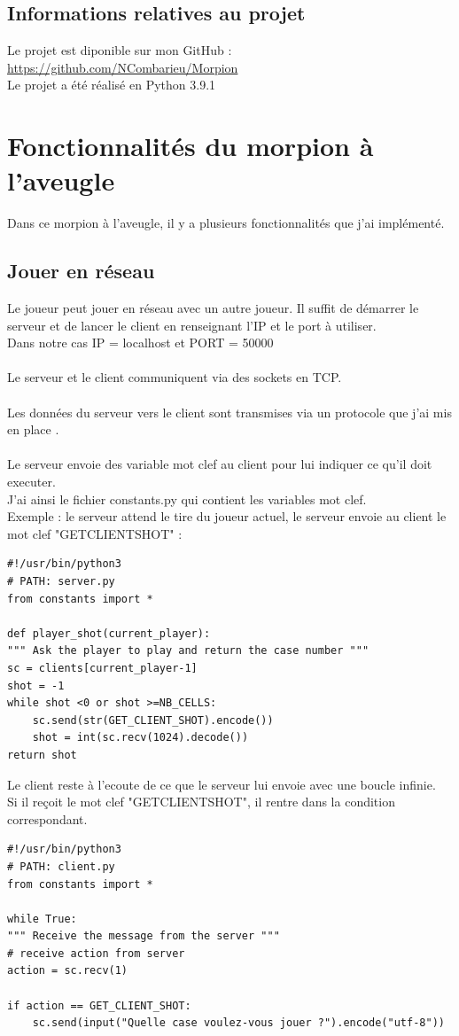 \documentclass{article}
\begin{document}
\subsection{Informations relatives au projet}
Le projet est diponible sur mon GitHub :
\url{https://github.com/NCombarieu/Morpion} \\
Le projet a été réalisé en Python 3.9.1 \\

\section{Fonctionnalités du morpion à l'aveugle}
Dans ce morpion à l'aveugle, il y a plusieurs fonctionnalités que j'ai implémenté.

\subsection{Jouer en réseau}
Le joueur peut jouer en réseau avec un autre joueur. Il suffit de démarrer le serveur et de lancer le client en renseignant l'IP et le port à utiliser. \\
Dans notre cas IP = localhost et PORT = 50000 \\\\
Le serveur et le client communiquent via des sockets en TCP. \\\\
Les données du serveur vers le client sont transmises via un protocole que j'ai mis en place . \\\\
Le serveur envoie des variable mot clef au client pour lui indiquer ce qu'il
doit executer.\\
J'ai ainsi le fichier constants.py qui contient les variables mot clef.\\
Exemple : le serveur attend le tire du joueur actuel, le serveur envoie au client le mot clef "GET\textunderscore CLIENT\textunderscore SHOT" :\\
\begin{lstlisting}
#!/usr/bin/python3
# PATH: server.py
from constants import *

def player_shot(current_player):
""" Ask the player to play and return the case number """
sc = clients[current_player-1]
shot = -1
while shot <0 or shot >=NB_CELLS:
    sc.send(str(GET_CLIENT_SHOT).encode())
    shot = int(sc.recv(1024).decode())
return shot
\end{lstlisting}
Le client reste à l'ecoute de ce que le serveur lui envoie avec une boucle infinie.\\
Si il reçoit le mot clef "GET\textunderscore CLIENT\textunderscore SHOT", il rentre dans la condition correspondant.\\
\begin{lstlisting}
#!/usr/bin/python3
# PATH: client.py
from constants import *

while True:
""" Receive the message from the server """
# receive action from server
action = sc.recv(1)

if action == GET_CLIENT_SHOT:
    sc.send(input("Quelle case voulez-vous jouer ?").encode("utf-8"))
\end{lstlisting}
\newpage
\end{document}
